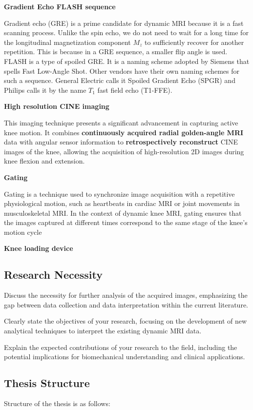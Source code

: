 \documentclass{micro-econ-thesis}
\begin{document}
\textbf{Gradient Echo FLASH sequence}

Gradient echo (GRE) is a prime candidate for dynamic MRI because it is a fast scanning process. Unlike the spin echo, we do not need to wait for a long time for the longitudinal magnetization component $M_z$ to sufficiently recover for another repetition. This is because in a GRE sequence, a smaller flip angle is used. FLASH is a type of spoiled GRE. It is a naming scheme adopted by Siemens that spells Fast Low-Angle Shot. Other vendors have their own naming schemes for such a sequence. General Electric calls it Spoiled Gradient Echo (SPGR) and Philips calls it by the name $T_1$ fast field echo (T1-FFE). \parencite[p.583]{bernstein_handbook_2004}  

\textbf{High resolution CINE imaging}

This imaging technique presents a significant advancement in capturing active knee motion. 
It combines \textbf{continuously acquired radial golden-angle MRI} data with angular sensor information to\textbf{ retrospectively reconstruct} CINE images of the knee, allowing the acquisition of high-resolution 2D images during knee flexion and extension. 

\textbf{Gating} 

Gating is a technique used to synchronize image acquisition with a repetitive physiological motion, such as heartbeats in cardiac MRI or joint movements in musculoskeletal MRI. In the context of dynamic knee MRI, gating ensures that the images captured at different times correspond to the same stage of the knee's motion cycle

\textbf{Knee loading device }
\parencite{brisson_novel_2022}
\subsection{Research Necessity}
Discuss the necessity for further analysis of the acquired images, emphasizing the gap between data collection and data interpretation within the current literature.

Clearly state the objectives of your research, focusing on the development of new analytical techniques to interpret the existing dynamic MRI data.

Explain the expected contributions of your research to the field, including the potential implications for biomechanical understanding and clinical applications.

\subsection{Thesis Structure}
Structure of the thesis is as follows: 
\end{document}
